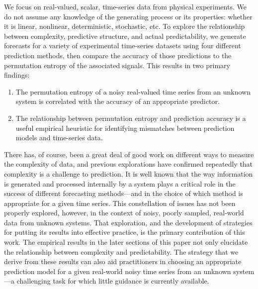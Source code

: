 \documentclass[%
pre,
reprint,
superscriptaddress,
showpacs,
nofootinbib,
nobibnotes,
 amsmath,amssymb,
 aps,
]{revtex4-1}
\begin{document}
We focus on real-valued, scalar, time-series data from physical experiments.
%
%
We do not assume any knowledge of the generating process or its
properties: whether it is linear, nonlinear, deterministic,
stochastic, etc.  To explore the relationship between complexity,
predictive structure, and actual predictability, we generate forecasts
for a variety of experimental time-series datasets using four
different prediction methods, then compare the accuracy of those
predictions to the permutation entropy of the associated signals.
This results in two primary findings:
% 
\begin{enumerate}

\item The permutation entropy of a noisy real-valued time series from
  an unknown system is correlated with the accuracy of an appropriate
  predictor.

\item The relationship between permutation entropy and prediction
  accuracy is a useful empirical heuristic for identifying mismatches
  between prediction models and time-series data.

\end{enumerate}
% 
There has, of course, been a great deal of good work on different ways
to measure the complexity of data, and previous explorations have
confirmed repeatedly that complexity is a challenge to prediction.  It
is well known that the way information is generated and processed
internally by a system plays a critical role in the success of
different forecasting methods---and in the choice of which method is
appropriate for a given time series.  This constellation of issues has
not been properly explored, however, in the context of noisy, poorly
sampled, real-world data from unknown systems.  That exploration, and
the development of strategies for putting its results into effective
practice, is the primary contribution of this work.  The empirical
results in the later sections of this paper not only elucidate the
relationship between complexity and predictability.  The strategy that
we derive from these results can also aid practitioners in choosing an
appropriate prediction model for a given real-world noisy time series
from an unknown system---a challenging task for which little guidance
is currently available.
\end{document}
